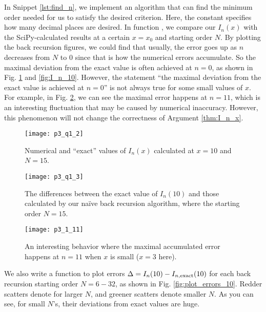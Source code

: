 In Snippet \ref{lst:find_n}, we implement an algorithm that can find the minimum order
needed for us to satisfy the desired criterion.
Here, the constant  specifies how many decimal places are desired.
In function , we compare
our \(I_n(x)\) with the SciPy-calculated results at a certain \(x = x_0\) and starting order \(N\).
By plotting the back recursion figures, we could find that usually, the error goes up
as \(n\) decreases from \(N\) to \(0\) since that is how the numerical errors accumulate.
So the maximal deviation from the exact value is often achieved at \(n = 0\), as shown in Fig. \ref{fig:plot_raw}
and \ref{fig:I_n_10}. However, the statement ``the maximal deviation from the exact value
is achieved at \(n = 0\)'' is not always true for some small values of \(x\). For example,
in Fig. \ref{fig:I_n_3}, we can see the maximal error happens at \(n = 11\), which is an
interesting fluctuation that may be caused by numerical inaccuracy. However, this phenomenon
will not change the correctness of Argument \ref{thm:I_n_x}.

\begin{figure}
    \centering
    \texttt{[image: p3\_q1\_2]}
    \caption{Numerical and ``exact'' values of \(I_n(x)\) calculated at \(x = 10\) and \(N = 15\).}
    \label{fig:plot_raw}
\end{figure}

\begin{figure} %
    \centering
    \begin{minipage}[t]{0.8\linewidth}
        \centering
        \texttt{[image: p3\_q1\_3]}
        \caption{The differences between the exact value of \(I_n(10)\) and those calculated by
            our naïve back recursion algorithm, where the starting order \(N = 15\).}
        \label{fig:I_n_10}
    \end{minipage}
    \hfil
    \begin{minipage}[t]{0.8\linewidth}
        \centering
        \texttt{[image: p3\_1\_11]}
        \caption{An interesting behavior where the maximal accumulated error happens at
            \(n = 11\) when \(x\) is small (\(x = 3\) here).}
        \label{fig:I_n_3}
    \end{minipage}
\end{figure}

We also write a function  to
plot errors \(\Delta = I_n(10) - I_{n,\textnormal{exact}}(10)\) for each
back recursion starting order \(N = 6 - 32\), as shown in Fig. \ref{fig:plot_errors_10}.
Redder scatters denote for larger \(N\), and greener scatters denote
smaller \(N\). As you can see, for small \(N\)'s, their deviations from exact values are huge.

